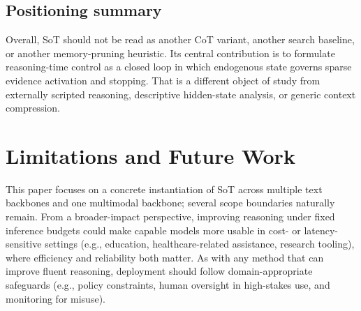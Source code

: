 \vspace{-1mm}
\subsection{Positioning summary}
\vspace{-1mm}
Overall, SoT should not be read as another CoT variant, another search baseline, or another memory-pruning heuristic.
Its central contribution is to formulate reasoning-time control as a closed loop in which endogenous state governs sparse evidence activation and stopping.
That is a different object of study from externally scripted reasoning, descriptive hidden-state analysis, or generic context compression.

\section{Limitations and Future Work}
\label{app:limitations_future}

This paper focuses on a concrete instantiation of SoT across multiple text backbones and one multimodal backbone; several scope boundaries naturally remain.
From a broader-impact perspective, improving reasoning under fixed inference budgets could make capable models more usable in cost- or latency-sensitive settings (e.g., education, healthcare-related assistance, research tooling), where efficiency and reliability both matter.
As with any method that can improve fluent reasoning, deployment should follow domain-appropriate safeguards (e.g., policy constraints, human oversight in high-stakes use, and monitoring for misuse).

